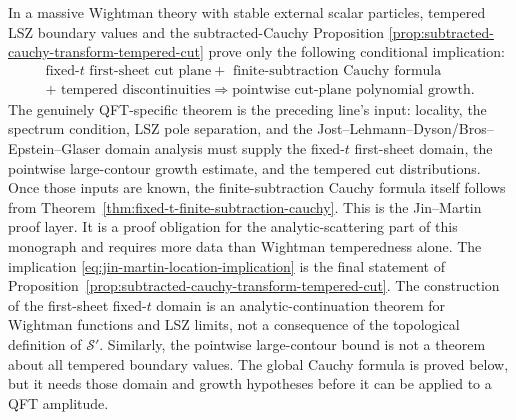 \begin{remark}
\label{rem:jin-martin-input-location}
In a massive Wightman theory with stable external scalar particles,
tempered LSZ boundary values and the subtracted-Cauchy Proposition
\ref{prop:subtracted-cauchy-transform-tempered-cut} prove only the following
conditional implication:
\begin{equation}
  \begin{gathered}
  \text{fixed-}t\text{ first-sheet cut plane}
  +\text{ finite-subtraction Cauchy formula}\\
  +\text{ tempered discontinuities}
  \Longrightarrow
  \text{pointwise cut-plane polynomial growth.}
  \end{gathered}
  \label{eq:jin-martin-location-implication}
\end{equation}
The genuinely QFT-specific theorem is the preceding line's input: locality,
the spectrum condition, LSZ pole separation, and the
Jost--Lehmann--Dyson/Bros--Epstein--Glaser domain analysis must supply the
fixed-\(t\) first-sheet domain, the pointwise large-contour growth estimate,
and the tempered cut distributions.  Once those inputs are known, the
finite-subtraction Cauchy formula itself follows from
Theorem~\ref{thm:fixed-t-finite-subtraction-cauchy}.  This is the
Jin--Martin proof layer.  It is a proof obligation for the analytic-scattering
part of this monograph and requires more data than Wightman temperedness
alone.
The implication \eqref{eq:jin-martin-location-implication} is the final
statement of Proposition~\ref{prop:subtracted-cauchy-transform-tempered-cut}.
The construction of the first-sheet fixed-\(t\) domain is an
analytic-continuation theorem for Wightman functions and LSZ limits, not a
consequence of the topological definition of \(\mathcal S'\).  Similarly, the
pointwise large-contour bound is not a theorem about all tempered boundary
values.  The global Cauchy formula is proved below, but it needs those domain
and growth hypotheses before it can be applied to a QFT amplitude.
\end{remark}

